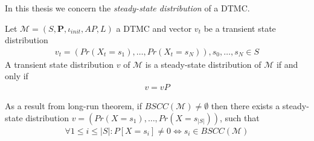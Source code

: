 In this thesis we concern the \textit{steady-state distribution} of a DTMC.
\begin{definition}
      Let $\mathcal{M}=(S,\mathbf{P}, \iota_{init}, AP,L)$ a DTMC and vector $v_t$ be a transient state distribution
      \begin{align*}
            v_t = (Pr(X_t=s_1),\ldots,Pr(X_t=s_N)), s_0,\ldots,s_N \in S
      \end{align*}
      A transient state distribution $v$ of $\mathcal{M}$ is a steady-state distribution of $\mathcal{M}$ if and only if
      \begin{align*}
            v = vP
      \end{align*}
\end{definition}
As a result from long-run theorem, if $BSCC(\mathcal{M})\neq \emptyset$ then there exists a
steady-state distribution $v = (Pr(X=s_1),\ldots,Pr(X=s_{|S|}))$, such that
\begin{align*}
      \forall 1 \leq i \leq |S|: P[X=s_i] \neq 0 \Leftrightarrow s_i \in BSCC(\mathcal{M})
\end{align*}


